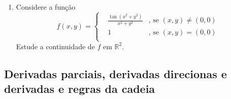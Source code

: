 \documentclass[11pt]{article}
\begin{document}
\begin{enumerate}
         \item Considere a função 
     $$
    f(x,y)= \left\{  
            \begin{array}{lll}
    &\frac{\tan(x^{2}+y^{2})}{x^{2}+y^2} &\text{, se } (x,y)\neq (0,0) \\
    & 1 &\text{, se } (x,y)=(0,0)  \\
            \end{array}
            \right. 
    $$      
    Estude a continuidade de $f$ em $\mathbb{R}^{2}$.
    \end{enumerate}
    
  \subsection{Derivadas parciais, derivadas direcionas e  derivadas e regras da cadeia}  
\end{document}
